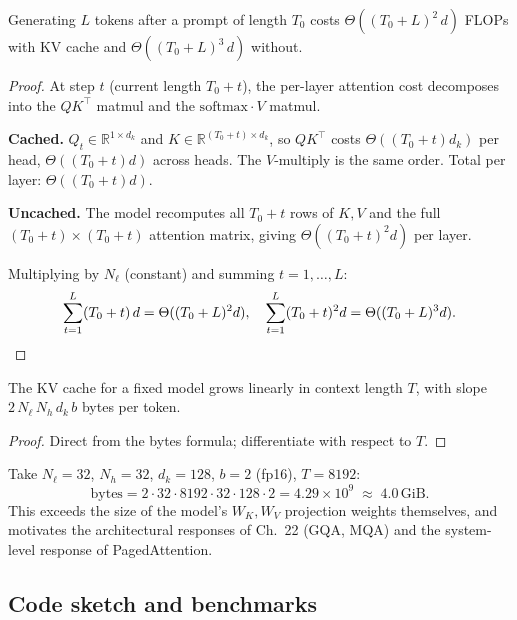 \begin{theorem}\label{thm:compute}
Generating $L$ tokens after a prompt of length $T_0$ costs $\Theta((T_0 + L)^2 \, d)$ FLOPs with KV cache and $\Theta((T_0 + L)^3 \, d)$ without.
\end{theorem}

\begin{proof}
At step $t$ (current length $T_0 + t$), the per-layer attention cost decomposes into the $QK^\top$ matmul and the $\mathrm{softmax} \cdot V$ matmul.

\textbf{Cached.} $Q_t \in \mathbb{R}^{1 \times d_k}$ and $K \in \mathbb{R}^{(T_0+t) \times d_k}$, so $Q K^\top$ costs $\Theta((T_0+t) d_k)$ per head, $\Theta((T_0+t) d)$ across heads. The $V$-multiply is the same order. Total per layer: $\Theta((T_0 + t) d)$.

\textbf{Uncached.} The model recomputes all $T_0 + t$ rows of $K, V$ and the full $(T_0+t) \times (T_0+t)$ attention matrix, giving $\Theta((T_0 + t)^2 d)$ per layer.

Multiplying by $N_\ell$ (constant) and summing $t = 1, \ldots, L$:
\[ \sum_{t=1}^{L}(T_0+t)\,d = \Theta((T_0+L)^2 d), \quad \sum_{t=1}^{L}(T_0+t)^2 d = \Theta((T_0+L)^3 d). \qedhere \]
\end{proof}

\begin{theorem}\label{thm:mem}
The KV cache for a fixed model grows linearly in context length $T$, with slope $2 \, N_\ell \, N_h \, d_k \, b$ bytes per token.
\end{theorem}

\begin{proof}
Direct from the bytes formula; differentiate with respect to $T$.
\end{proof}

\begin{corollary}[Llama-7B at 8k]
Take $N_\ell = 32$, $N_h = 32$, $d_k = 128$, $b = 2$ (fp16), $T = 8192$:
\[ \mathrm{bytes} = 2 \cdot 32 \cdot 8192 \cdot 32 \cdot 128 \cdot 2 = 4.29 \times 10^9 \;\approx\; 4.0 \,\mathrm{GiB}. \]
This exceeds the size of the model's $W_K, W_V$ projection weights themselves, and motivates the architectural responses of Ch.~22 (GQA, MQA) and the system-level response of PagedAttention.
\end{corollary}

\subsection*{Code sketch and benchmarks}

